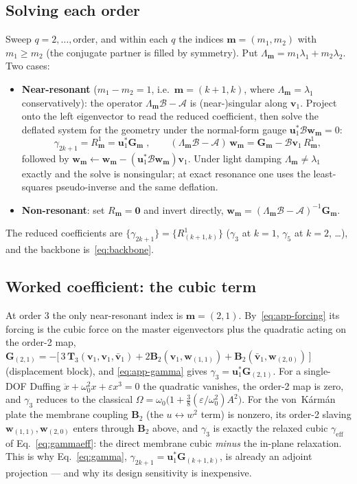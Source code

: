 \documentclass[11pt]{article}
\newcommand{\Om}{\Omega}
\begin{document}
\subsection{Solving each order}
Sweep $q=2,\dots,\text{order}$, and within each $q$ the indices $\bm m=(m_1,m_2)$ with
$m_1\ge m_2$ (the conjugate partner is filled by symmetry). Put
$\Lambda_{\bm m}=m_1\lambda_1+m_2\lambda_2$. Two cases:
\begin{itemize}
\item \textbf{Near-resonant} ($m_1-m_2=1$, i.e.\ $\bm m=(k{+}1,k)$, where
$\Lambda_{\bm m}=\lambda_1$ conservatively): the operator $\Lambda_{\bm m}\bm{\mathcal B}
-\bm{\mathcal A}$ is (near-)singular along $\bm v_1$. Project onto the left eigenvector
to read the reduced coefficient, then solve the deflated system for the geometry under
the normal-form gauge $\bm u_1^{*}\bm{\mathcal B}\bm w_{\bm m}=0$:
\begin{equation}
\boxed{\;\gamma_{2k+1}=R^1_{\bm m}=\bm u_1^{*}\bm G_{\bm m}\;},\qquad
(\Lambda_{\bm m}\bm{\mathcal B}-\bm{\mathcal A})\,\bm w_{\bm m}
=\bm G_{\bm m}-\bm{\mathcal B}\bm v_1\,R^1_{\bm m},
\label{eq:app-gamma}
\end{equation}
followed by $\bm w_{\bm m}\!\leftarrow\!\bm w_{\bm m}-(\bm u_1^{*}\bm{\mathcal B}\bm w_{\bm m})\bm v_1$.
Under light damping $\Lambda_{\bm m}\ne\lambda_1$ exactly and the solve is nonsingular; at
exact resonance one uses the least-squares pseudo-inverse and the same deflation.
\item \textbf{Non-resonant}: set $R_{\bm m}=\bm 0$ and invert directly,
$\bm w_{\bm m}=(\Lambda_{\bm m}\bm{\mathcal B}-\bm{\mathcal A})^{-1}\bm G_{\bm m}$.
\end{itemize}
The reduced coefficients are $\{\gamma_{2k+1}\}=\{R^1_{(k+1,k)}\}$ ($\gamma_3$ at
$k{=}1$, $\gamma_5$ at $k{=}2$, \dots), and the backbone is~\eqref{eq:backbone}.

\subsection{Worked coefficient: the cubic term}
At order 3 the only near-resonant index is $\bm m=(2,1)$. By~\eqref{eq:app-forcing} its
forcing is the cubic force on the master eigenvectors plus the quadratic acting on the
order-2 map, $\bm G_{(2,1)}=-\big[\,3\,\bm T_3(\bm v_1,\bm v_1,\bar{\bm v}_1)
+2\bm B_2(\bm v_1,\bm w_{(1,1)})+\bm B_2(\bar{\bm v}_1,\bm w_{(2,0)})\,\big]$ (displacement
block), and \eqref{eq:app-gamma} gives $\gamma_3=\bm u_1^{*}\bm G_{(2,1)}$. For a
single-DOF Duffing $\ddot x+\omega_0^2x+\varepsilon x^3=0$ the quadratic vanishes, the
order-2 map is zero, and $\gamma_3$ reduces to the classical
$\Om=\omega_0\big(1+\tfrac38(\varepsilon/\omega_0^2)A^2\big)$. For the von~K\'arm\'an
plate the membrane coupling $\bm B_2$ (the $u\!\leftrightarrow\!w^2$ term) is nonzero, its
order-2 slaving $\bm w_{(1,1)},\bm w_{(2,0)}$ enters through $\bm B_2$ above, and
$\gamma_3$ is exactly the relaxed cubic $\gamma_{\mathrm{eff}}$ of
Eq.~\eqref{eq:gammaeff}: the direct membrane cubic \emph{minus} the in-plane relaxation.
This is why Eq.~\eqref{eq:gamma}, $\gamma_{2k+1}=\bm u_1^{*}\bm G_{(k+1,k)}$, is already an
adjoint projection --- and why its design sensitivity is inexpensive.
\end{document}
